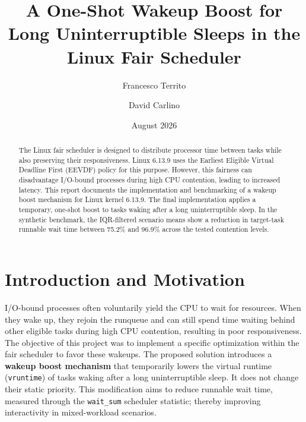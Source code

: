 \documentclass[11pt, a4paper]{article}
\title{\textbf{A One-Shot Wakeup Boost for Long Uninterruptible Sleeps in the Linux Fair Scheduler}}
\author{Francesco Territo \and David Carlino}
\date{August 2026}
\begin{document}
\maketitle

\begin{abstract}
The Linux fair scheduler is designed to distribute processor time between tasks while also preserving their responsiveness. Linux 6.13.9 uses the Earliest Eligible Virtual Deadline First (EEVDF) policy for this purpose.
However, this fairness can disadvantage I/O-bound processes during high CPU contention, leading to increased latency.
This report documents the implementation and benchmarking of a wakeup boost mechanism for Linux kernel 6.13.9.
The final implementation applies a temporary, one-shot boost to tasks waking after a long uninterruptible sleep. In the synthetic benchmark, the IQR-filtered scenario means show a reduction in target-task runnable wait time between 75.2\% and 96.9\% across the tested contention levels.
\end{abstract}

\section{Introduction and Motivation}
I/O-bound processes often voluntarily yield the CPU to wait for resources. When they wake up, they rejoin the runqueue and can still spend time waiting behind other eligible tasks during high CPU contention, resulting in poor responsiveness.
The objective of this project was to implement a specific optimization within the fair scheduler to favor these wakeups.
The proposed solution introduces a \textbf{wakeup boost mechanism} that temporarily lowers the virtual runtime (\texttt{vruntime}) of tasks waking after a long uninterruptible sleep. It does not change their static priority.
This modification aims to reduce runnable wait time, measured through the \texttt{wait\_sum} scheduler statistic; thereby improving interactivity in mixed-workload scenarios.
\end{document}
